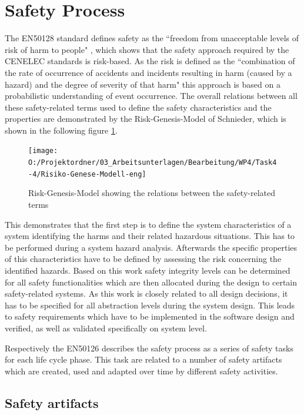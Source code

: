 \documentclass{template/openetcs_article}
\begin{document}

\section{Safety Process}

The EN50128 standard defines safety as the ``freedom from unacceptable levels of risk of harm to people" \cite{EN50128:2011}, which shows that the safety approach required by the CENELEC standards is risk-based. As the risk is defined as the ``combination of the rate of occurrence of accidents and incidents resulting in harm (caused by a hazard) and the degree of severity  of that harm" \cite{EN50128:2011} this approach is based on a probabilistic understanding of event occurrence. The overall relations between all these safety-related terms used to define the safety characteristics and the properties are demonstrated by the Risk-Genesis-Model of Schnieder, which is shown in the following figure \ref{fig:Risiko-Genese-Modell-eng}.

\begin{figure}[h]
\centering
\texttt{[image: O:/Projektordner/03\_Arbeitsunterlagen/Bearbeitung/WP4/Task4-4/Risiko-Genese-Modell-eng]}
\caption{Risk-Genesis-Model showing the relations between the safety-related terms \cite{Schnieder.2010}}
\label{fig:Risiko-Genese-Modell-eng}
\end{figure}

This demonstrates that the first step is to define the system characteristics of a system identifying the harms and their related hazardous situations. This has to be performed during a system hazard analysis. Afterwards the specific properties of this characteristics have to be defined by assessing the risk concerning the identified hazards. Based on this work safety integrity levels can be determined for all safety functionalities which are then allocated during the design to certain safety-related systems. As this work is closely related to all design decisions, it has to be specified for all abstraction levels during the system design. This leads to safety requirements which have to be implemented in the software design and verified, as well as validated specifically on system level. 

Respectively the EN50126 describes the safety process as a series of safety tasks for each life cycle phase. This task are related to a number of safety artifacts which are created, used and adapted over time by different safety activities.

\subsection{Safety artifacts}
\end{document}
